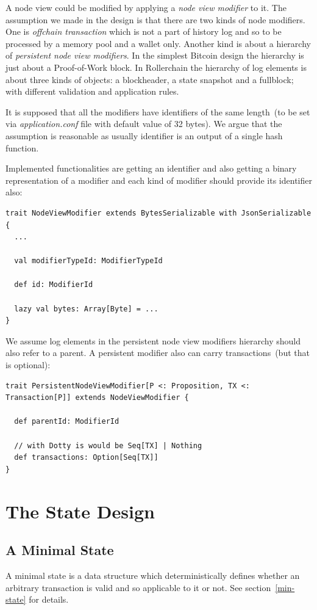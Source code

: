 \documentclass[]{report}   %
\begin{document}
A node view could be modified by applying a \textit{node view modifier} to it. The assumption we made in the design is that there are two kinds of node modifiers. One is \textit{offchain transaction} which is not a part of history log and so to be processed by a memory pool and a wallet only. Another kind is about a hierarchy of \textit{persistent node view modifiers}. In the simplest Bitcoin design the hierarchy is just about a Proof-of-Work block. In Rollerchain the hierarchy of log elements is about three kinds of objects: a blockheader, a state snapshot and a fullblock; with different validation and application rules.

It is supposed that all the modifiers have identifiers of the same length~(to be set via \textit{application.conf} file with default value of 32 bytes). We argue that the assumption is reasonable as usually identifier is an output of a single hash function.  

Implemented functionalities are getting an identifier and also getting a binary representation of a modifier and each kind of modifier should provide its identifier also:

\begin{lstlisting}
trait NodeViewModifier extends BytesSerializable with JsonSerializable {
  ...

  val modifierTypeId: ModifierTypeId

  def id: ModifierId

  lazy val bytes: Array[Byte] = ...
}
\end{lstlisting}

We assume log elements in the persistent node view modifiers hierarchy should also refer to a parent. A persistent modifier also can carry transactions~(but that is optional): 

\begin{lstlisting}
trait PersistentNodeViewModifier[P <: Proposition, TX <: Transaction[P]] extends NodeViewModifier {

  def parentId: ModifierId

  // with Dotty is would be Seq[TX] | Nothing
  def transactions: Option[Seq[TX]]
}
\end{lstlisting}


\section{The State Design}

\subsection{A Minimal State}
A minimal state is a data structure which deterministically defines whether an arbitrary transaction is valid and so
applicable to it or not. See section~\ref{min-state} for details.
\end{document}
